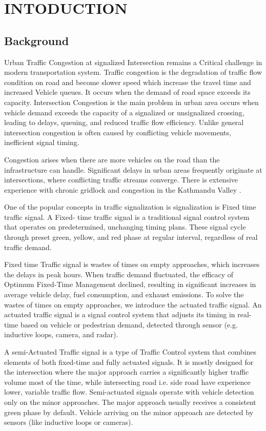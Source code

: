 \chapter{INTODUCTION}

\section{Background}

Urban Traffic Congestion at signalized Intersection remains a Critical 
challenge in modern transportation system. Traffic congestion is the 
degradation of traffic flow condition on road and become slower speed 
which increase the travel time and increased Vehicle queues. It occurs 
when the demand of road space exceeds its capacity.  Intersection 
Congestion is the main problem in urban area occurs when vehicle demand 
exceeds the capacity of a signalized or unsignalized crossing, leading to 
delays, queuing, and reduced traffic flow efficiency. Unlike general 
intersection congestion is often caused by conflicting vehicle movements, 
inefficient signal timing.

Congestion arises when there are more vehicles on the road than the 
infrastructure can handle. Significant delays in urban areas frequently 
originate at intersections, where conflicting traffic streams converge. 
There is extensive experience with chronic gridlock and congestion in the Kathmandu Valley \cite{tiwari2023}. 

One of the popular concepts in traffic signalization is signalization is 
Fixed time traffic signal. A Fixed- time traffic signal is a traditional 
signal control system that operates on predetermined, unchanging timing plans.
These signal cycle through preset green, yellow, and red phase at regular interval, regardless of real traffic demand.   

Fixed time Traffic signal is wastes of times on empty approaches, which increases 
the delays in peak hours. When traffic demand fluctuated, the efficacy of Optimum 
Fixed-Time Management declined, resulting in significant increases in average 
vehicle delay, fuel consumption, and exhaust emissions.  To solve the wastes of 
times on empty approaches, we introduce the actuated traffic signal. An actuated 
traffic signal is a signal control system that adjusts its timing in real-time
based on vehicle or pedestrian demand, detected through sensor (e.g. inductive loops, camera, and radar). 

A semi-Actuated Traffic signal is a type of Traffic Control system that combines 
elements of both fixed-time and fully actuated signals. It is mostly designed for the intersection
where the major approach carries a significantly higher traffic volume most of the time,
while intersecting road i.e. side road have experience lower, variable traffic flow.
Semi-actuated signals operate with vehicle detection only on the minor approaches.
The major approach usually receives a consistent green phase by default. Vehicle arriving
on the minor approach are detected by sensors (like inductive loops or cameras).

